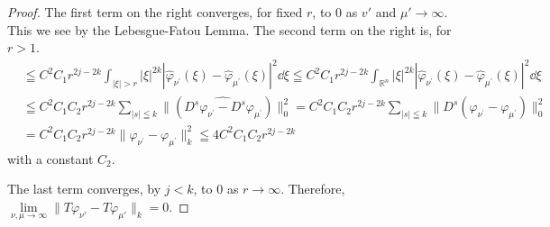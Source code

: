 \begin{proof}
The first term on the right converges, for fixed $r$, to $0$ as $v'$ and $\mu' \to \infty$. This we see by the Lebesgue-Fatou Lemma. The second term on the right is, for $r > 1$. 
\[
\begin{aligned}
&\leqq C ^{2} C _{1} r ^{2j-2k} \int_{| \xi | > r} | \xi | ^{2k} | \hat {\varphi} _ {\nu^{\prime}} (\xi) - \hat {\varphi} _ {\mu^{\prime}} (\xi) | ^{2} \dd \xi \leqq C ^{2} C _{1} r ^{2j-2k} \int_ {\mathbb{R}^{n}} | \xi | ^{2k} | \hat {\varphi} _ {\nu^{\prime}} (\xi) - \hat {\varphi} _ {\mu^{\prime}} (\xi) | ^{2} \dd \xi
\\
&\leqq C ^{2} C _{1} C _{2} r ^{2j-2k} \sum\limits_{| s | \leqq k} \| (D ^{s} \widehat {\varphi_ {\nu^{\prime}} - D ^{s}} \varphi_ {\mu^{\prime}}) \| _{0} ^{2} = C ^{2} C _{1} C _{2} r ^{2j-2k} \sum\limits_{| s | \leqq k} \| D ^{s} (\varphi_ {\nu^{\prime}} - \varphi_ {\mu^{\prime}}) \| _{0} ^{2}
\\
&= C ^{2} C _{1} C _{2} r ^{2j-2k} \| \varphi_ {\nu^{\prime}} - \varphi_ {\mu^{\prime}} \| _{k} ^{2} \leqq 4 C ^{2} C _{1} C _{2} r ^{2j-2k}
\end{aligned}
\]
with a constant $C_2$. 

The last term converges, by $j < k$, to $0$ as $r \to \infty$. Therefore, $\lim\limits_{\nu, \mu \to \infty} \| T \varphi_{\nu'} - T \varphi_{\mu'} \|_k = 0$. 
\end{proof}


\label{sec:X.4}

